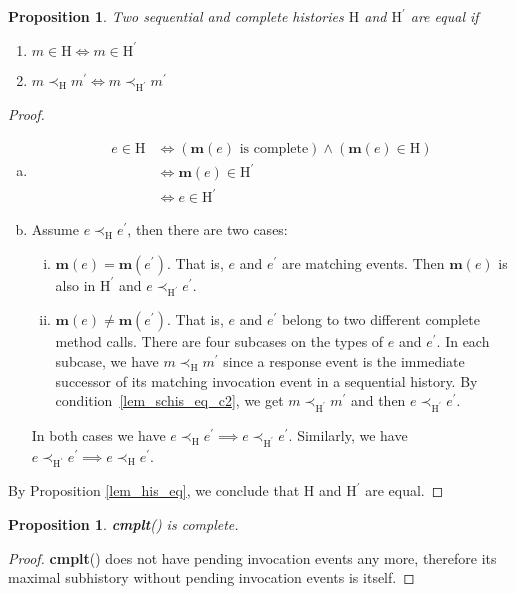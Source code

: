 \documentclass[a4paper,USenglish]{lipics-v2016}
\newtheorem{prop}[theorem]{Proposition}
\newcommand{\cmplt}{\textbf{cmplt}}
\newcommand{\mym}{\textbf{m}}
\newcommand{\his}{\text{H}}
\begin{document}
\begin{prop}\label{lem_schis_eq}
	Two sequential and complete histories $\his$ and $\his^\prime$ are equal if
	\begin{enumerate}[(1)]
		\item\label{lem_schis_eq_c1}
		$m \in \his \iff m \in \his^\prime$
		\item\label{lem_schis_eq_c2}
		$m \prec_{\his} m^\prime \iff m \prec_{\his^\prime} m^\prime$
	\end{enumerate}
\end{prop}
\begin{proof}
	\begin{enumerate}[(a)]
		\item
		\begin{align*}
		e \in \his &\iff (\mym(e) \text{ is complete}) \land (\mym(e) \in \his)\\
		&\iff \mym(e) \in \his^\prime \\
		&\iff e \in \his^\prime
		\end{align*}
		
		\item
		Assume $e \prec_{\his} e^\prime$, then there are two cases:
		\begin{enumerate}[(i)]
			\item
			$\mym(e) = \mym(e^\prime)$. That is, $e$ and $e^\prime$ are matching events. Then $\mym(e)$ is also in $\his^\prime$ and $e \prec_{\his^\prime} e^\prime$.
			\item
			$\mym(e) \neq \mym(e^\prime)$. That is, $e$ and $e^\prime$ belong to two different complete method calls.
			There are four subcases on the types of $e$ and $e^\prime$. In each subcase, we have $m \prec_{\his} m^\prime$
			since a response event is the immediate successor of its matching invocation event in a sequential history.
			By condition~\ref{lem_schis_eq_c2}, we get $m \prec_{\his^\prime} m^\prime$ and then $e \prec_{\his^\prime} e^\prime$.
		\end{enumerate}	
		In both cases we have $e \prec_{\his} e^\prime \implies e \prec_{\his^\prime} e^\prime$.
		Similarly, we have $e \prec_{\his^\prime} e^\prime \implies e \prec_{\his} e^\prime$.
	\end{enumerate}
	By Proposition \ref{lem_his_eq}, we conclude that $\his$ and $\his^\prime$ are equal.
\end{proof}

\begin{prop}\label{lem_chis_1}
	\cmplt({\his}) is complete.
\end{prop}
\begin{proof}
	\cmplt({\his}) does not have pending invocation events any more, therefore its maximal subhistory without pending invocation events is itself.
\end{proof}
\end{document}
